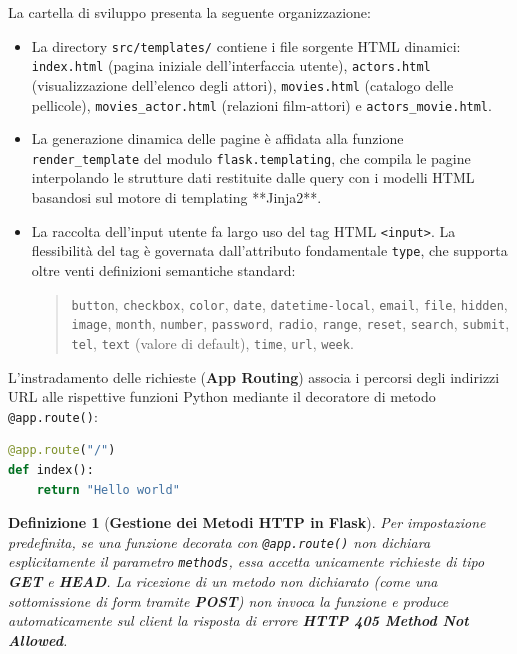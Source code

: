 \documentclass[11pt, a4paper]{article}
\newtheorem{theorem}{Definizione}
\begin{document}
La cartella di sviluppo presenta la seguente organizzazione:
\begin{itemize}
    \item La directory \texttt{src/templates/} contiene i file sorgente HTML dinamici: \texttt{index.html} (pagina iniziale dell'interfaccia utente), \texttt{actors.html} (visualizzazione dell'elenco degli attori), \texttt{movies.html} (catalogo delle pellicole), \texttt{movies\_actor.html} (relazioni film-attori) e \texttt{actors\_movie.html}.
    \item La generazione dinamica delle pagine è affidata alla funzione \texttt{render\_template} del modulo \texttt{flask.templating}, che compila le pagine interpolando le strutture dati restituite dalle query con i modelli HTML basandosi sul motore di templating **Jinja2**.
    \item La raccolta dell'input utente fa largo uso del tag HTML \texttt{<input>}. La flessibilità del tag è governata dall'attributo fondamentale \texttt{type}, che supporta oltre venti definizioni semantiche standard:
    \begin{quote}
        \texttt{button}, \texttt{checkbox}, \texttt{color}, \texttt{date}, \texttt{datetime-local}, \texttt{email}, \texttt{file}, \texttt{hidden}, \texttt{image}, \texttt{month}, \texttt{number}, \texttt{password}, \texttt{radio}, \texttt{range}, \texttt{reset}, \texttt{search}, \texttt{submit}, \texttt{tel}, \texttt{text} (valore di default), \texttt{time}, \texttt{url}, \texttt{week}.
    \end{quote}
\end{itemize}

L'instradamento delle richieste (\textbf{App Routing}) associa i percorsi degli indirizzi URL alle rispettive funzioni Python mediante il decoratore di metodo \texttt{@app.route()}:
\begin{lstlisting}[language=python]
@app.route("/")
def index():
    return "Hello world"
\end{lstlisting}

\begin{theorem}[\textbf{Gestione dei Metodi HTTP in Flask}]
Per impostazione predefinita, se una funzione decorata con \texttt{@app.route()} non dichiara esplicitamente il parametro \texttt{methods}, essa accetta unicamente richieste di tipo \textbf{GET} e \textbf{HEAD}.
La ricezione di un metodo non dichiarato (come una sottomissione di form tramite \textbf{POST}) non invoca la funzione e produce automaticamente sul client la risposta di errore \textbf{HTTP 405 Method Not Allowed}.
\end{theorem}
\end{document}
